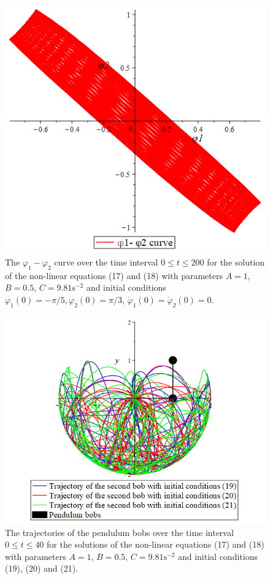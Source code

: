 \documentclass[11pt]{article}
\begin{document}
\begin{figure}[H]
    \centering
    \includegraphics[scale=0.4]{Figure7.PNG}
    \caption{The \(\varphi_1 - \varphi_2\) curve over the time interval \(0\le t\le 200\) for the solution of the non-linear equations (17) and (18) with parameters \(A = 1\), \(B= 0.5\), \(C = 9.81 \mathrm{s}^{-2}\) and initial conditions \(\varphi_1(0)= -\pi/5, \varphi_2(0) = \pi/3\), \(\dot{\varphi}_1(0) = \dot{\varphi}_2(0) = 0\).}
    \label{Figure 7}
\end{figure}
\begin{figure}[ht]
    \centering
    \includegraphics[scale=0.5]{Figure8.PNG}
    \caption{The trajectories of the pendulum bobs over the time interval \(0\le t\le 40\) for the solutions of the non-linear equations (17) and (18) with parameters \(A = 1\), \(B= 0.5\), \(C = 9.81 \mathrm{s}^{-2}\) and initial conditions (19), (20) and (21).}
    \label{Figure 8}
\end{figure}
\end{document}
